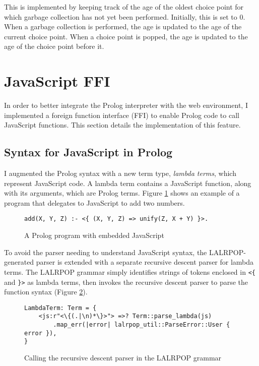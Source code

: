 This is implemented by keeping track of the age of the oldest choice point for which garbage collection has not yet been performed. Initially, this is set to 0. When a garbage collection is performed, the age is updated to the age of the current choice point. When a choice point is popped, the age is updated to the age of the choice point before it.

\section{JavaScript FFI}

\label{sec:js-ffi}

In order to better integrate the Prolog interpreter with the web environment, I implemented a foreign function interface (FFI) to enable Prolog code to call JavaScript functions. This section details the implementation of this feature.

\subsection{Syntax for JavaScript in Prolog}

I augmented the Prolog syntax with a new term type, \emph{lambda terms}, which represent JavaScript code. A lambda term contains a JavaScript function, along with its arguments, which are Prolog terms. Figure \ref{fig:js-in-prolog} shows an example of a program that delegates to JavaScript to add two numbers.

\begin{figure}[H]
\centering
\begin{verbatim}
add(X, Y, Z) :- <{ (X, Y, Z) => unify(Z, X + Y) }>.
\end{verbatim}
\caption{A Prolog program with embedded JavaScript}
\label{fig:js-in-prolog}
\end{figure}

To avoid the parser needing to understand JavaScript syntax, the LALRPOP-generated parser is extended with a separate recursive descent parser for lambda terms. The LALRPOP grammar simply identifies strings of tokens enclosed in \texttt{<\{} and \texttt{\}>} as lambda terms, then invokes the recursive descent parser to parse the function syntax (Figure \ref{fig:js-grammar}).

\begin{figure}[H]
\centering
\begin{verbatim}
LambdaTerm: Term = {
    <js:r"<\{(.|\n)*\}>"> =>? Term::parse_lambda(js)
        .map_err(|error| lalrpop_util::ParseError::User { error }),
}
\end{verbatim}
\caption{Calling the recursive descent parser in the LALRPOP grammar}
\label{fig:js-grammar}
\end{figure}

